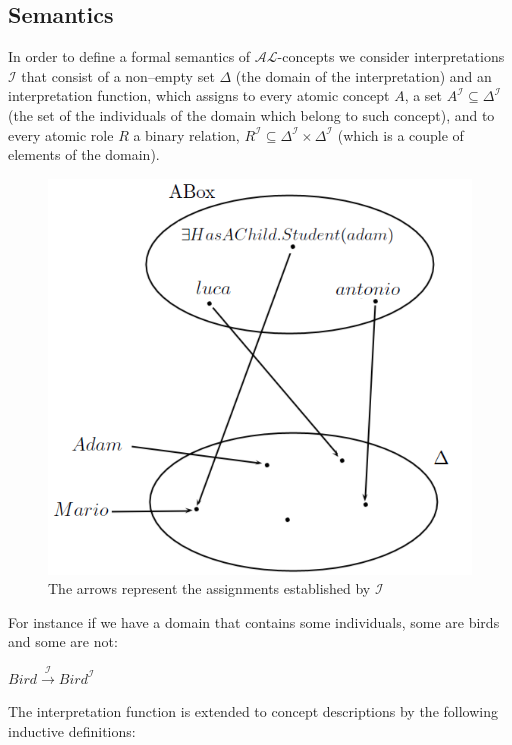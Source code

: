\documentclass[a4paper, 11pt, oneside]{duthesis}
\newcommand{\al}{\mathcal{AL}}
\newcommand{\II} {\mathcal{I}}
\begin{document}
\subsection{Semantics}

In order to define a formal semantics of $\al$-concepts we consider interpretations $\II$ that consist of a non--empty set $\Delta$ (the domain of the interpretation) and an interpretation function, which assigns to every atomic concept $A$, a set $A^{\II} \subseteq \Delta^{\II}$ (the set of the individuals of the domain which belong to such concept), and to every atomic role $R$ a binary relation, $R^{\II} \subseteq \Delta^{\II} \times \Delta^{\II}$ (which is a couple of elements of the domain).

\begin{figure}[!htp]
\centering
\includegraphics[scale=.50]{img/diagram1_1.png}
\caption{The arrows represent the assignments established by $\II$}
\label{}
\end{figure}


For instance if we have a domain that contains some individuals, some are birds and some are not:
\begin{center}
$Bird \xrightarrow{\mathcal{I}} Bird^{\mathcal{I}}$
\end{center}

The interpretation function is extended to concept descriptions by the following
inductive definitions:
\end{document}
